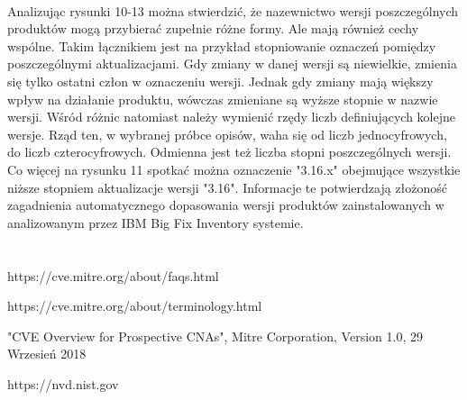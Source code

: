 \documentclass[a4paper,12pt,twoside]{article}
\begin{document}
\paragraph{}
Analizując rysunki 10-13 można stwierdzić, że nazewnictwo wersji poszczególnych produktów mogą przybierać zupełnie różne formy. Ale mają również cechy wspólne. Takim łącznikiem jest na przykład stopniowanie oznaczeń pomiędzy poszczególnymi aktualizacjami. Gdy zmiany w danej wersji są niewielkie, zmienia się tylko ostatni człon w oznaczeniu wersji. Jednak gdy zmiany mają większy wpływ na działanie produktu, wówczas zmieniane są wyższe stopnie w nazwie wersji. Wśród różnic natomiast należy wymienić rzędy liczb definiujących kolejne wersje. Rząd ten, w wybranej próbce opisów, waha się od liczb jednocyfrowych, do liczb czterocyfrowych. Odmienna jest też liczba stopni poszczególnych wersji. Co więcej na rysunku 11 spotkać można oznaczenie "3.16.x" obejmujące wszystkie niższe stopniem aktualizacje wersji "3.16". Informacje te potwierdzają złożoność zagadnienia automatycznego dopasowania wersji produktów zainstalowanych w analizowanym przez IBM Big Fix Inventory systemie.




\newpage
\section*{ }

\renewcommand{\refname}{Bibliografia}
\begin{thebibliography}{}


https://cve.mitre.org/about/faqs.html

https://cve.mitre.org/about/terminology.html

"CVE Overview for Prospective CNAs", Mitre Corporation, Version 1.0, 29 Wrzesień 2018

https://nvd.nist.gov
  

\end{thebibliography}

\newpage
\end{document}
